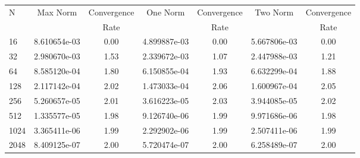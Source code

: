 \documentclass[12pt]{article}
\begin{document}
	\begin{tabular}{l|c|c|c|c|c|c}
		N&Max Norm&Convergence&One Norm&Convergence&Two Norm&Convergence\\
		&&Rate&&Rate&&Rate\\
		\hline
		16&8.610654e-03&0.00&4.899887e-03&0.00&5.667806e-03&0.00\\
		\hline
		32&2.980670e-03&1.53&2.339672e-03&1.07&2.447988e-03&1.21\\
		\hline
		64&8.585120e-04&1.80&6.150855e-04&1.93&6.632299e-04&1.88\\
		\hline
		128&2.117142e-04&2.02&1.473033e-04&2.06&1.600967e-04&2.05\\
		\hline
		256&5.260657e-05&2.01&3.616223e-05&2.03&3.944085e-05&2.02\\
		\hline
		512&1.335577e-05&1.98&9.126740e-06&1.99&9.971686e-06&1.98\\
		\hline
		1024&3.365411e-06&1.99&2.292902e-06&1.99&2.507411e-06&1.99\\
		\hline
		2048&8.409125e-07&2.00&5.720474e-07&2.00&6.258489e-07&2.00\\
	\end{tabular}
\end{document}
